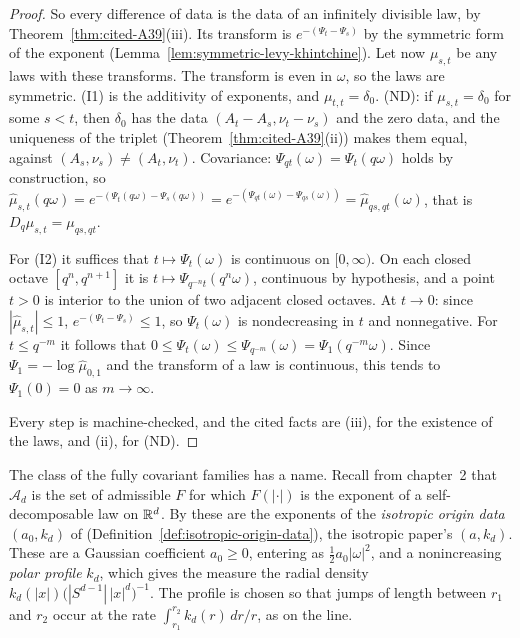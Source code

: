 \begin{proof}
So every difference of data is the data of an infinitely divisible law, by
Theorem~\ref{thm:cited-A39}(iii). Its transform is $e^{-(\Psi_t - \Psi_s)}$ by the symmetric form of the exponent (Lemma~\ref{lem:symmetric-levy-khintchine}). Let now
$\mu_{s,t}$ be any laws with these transforms. The transform is even in $\omega$, so the laws are
symmetric. (I1) is the additivity of exponents, and $\mu_{t,t} = \delta_0$. (ND): if
$\mu_{s,t} = \delta_0$ for some $s < t$, then $\delta_0$ has the data $(A_t - A_s, \nu_t - \nu_s)$
and the zero data, and the uniqueness of the triplet (Theorem~\ref{thm:cited-A39}(ii))
makes them equal, against $(A_s, \nu_s) \ne (A_t, \nu_t)$. Covariance:
$\Psi_{qt}(\omega) = \Psi_t(q\omega)$ holds by construction, so
$\widehat\mu_{s,t}(q\omega) = e^{-(\Psi_t(q\omega) - \Psi_s(q\omega))} = e^{-(\Psi_{qt}(\omega) -
\Psi_{qs}(\omega))} = \widehat\mu_{qs,qt}(\omega)$, that is $D_q\mu_{s,t} = \mu_{qs,qt}$.

For (I2) it suffices that $t \mapsto \Psi_t(\omega)$ is continuous on $[0,\infty)$. On each closed
octave $[q^n, q^{n+1}]$ it is $t \mapsto \Psi_{q^{-n}t}(q^n\omega)$, continuous by hypothesis, and
a point $t > 0$ is interior to the union of two adjacent closed octaves. At $t \to 0$: since
$|\widehat\mu_{s,t}| \le 1$, $e^{-(\Psi_t - \Psi_s)} \le 1$, so $\Psi_t(\omega)$ is nondecreasing
in $t$ and nonnegative. For $t \le q^{-m}$ it follows that
$0 \le \Psi_t(\omega) \le \Psi_{q^{-m}}(\omega) = \Psi_1(q^{-m}\omega)$. Since
$\Psi_1 = -\log\widehat\mu_{0,1}$ and the transform of a law is continuous, this tends to
$\Psi_1(0) = 0$ as $m \to \infty$.

Every step is machine-checked, and the cited facts are (iii), for the existence of the
laws, and (ii), for (ND).
\end{proof}

The class of the fully covariant families has a name. Recall from chapter~2 that $\mathcal{A}_d$ is
the set of admissible $F$ for which $F(|\cdot|)$ is the exponent of a self-decomposable law on
$\mathbb{R}^d$. By  these are the exponents of the
\emph{isotropic origin data} $(a_0, k_d)$ of 
(Definition~\ref{def:isotropic-origin-data}), the isotropic paper's $(a, k_d)$. These are a Gaussian
coefficient $a_0 \ge 0$, entering as $\tfrac12a_0|\omega|^2$, and a nonincreasing \emph{polar profile} $k_d$, which gives the \Levy{}
measure the radial density $k_d(|x|)\bigl(|S^{d-1}|\,|x|^d\bigr)^{-1}$. The profile is chosen so
that jumps of length between $r_1$ and $r_2$ occur at the rate $\int_{r_1}^{r_2}k_d(r)\,dr/r$, as
on the line.

